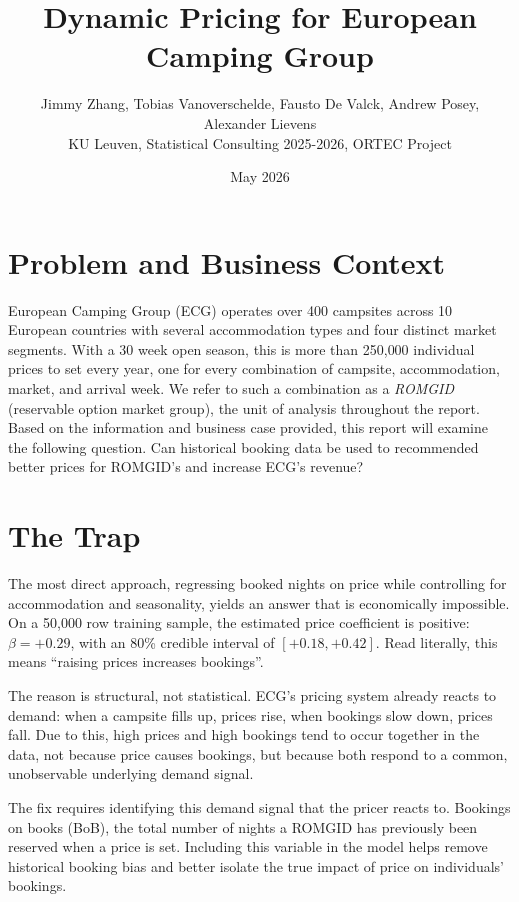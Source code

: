 \documentclass[11pt,a4paper]{article}
\title{Dynamic Pricing for European Camping Group}
\author{Jimmy Zhang, Tobias Vanoverschelde, Fausto De Valck, Andrew Posey,
Alexander Lievens \\ KU Leuven, Statistical Consulting 2025-2026, ORTEC Project}
\date{May 2026}
\begin{document}
\maketitle

\section{Problem and Business Context}

European Camping Group (ECG) operates over 400 campsites across 10 European countries with several accommodation types and four distinct market segments. With a 30 week open season, this is more than 250{,}000 individual prices to set every year, one for every combination of campsite, accommodation, market, and arrival week. We refer to such a combination as a \emph{ROMGID} (reservable option market group), the unit of analysis throughout the report. Based on the information and business case provided, this report will examine the following question. Can historical booking data be used to recommended better prices for ROMGID’s and increase ECG’s revenue?

\section{The Trap}

The most direct approach, regressing booked nights on price while controlling for accommodation and seasonality, yields an answer that is economically impossible. On a 50{,}000 row training sample, the estimated price coefficient is positive: $\beta = +0.29$, with an 80\% credible interval of $[+0.18, +0.42]$. Read literally, this means ``raising prices increases bookings''.

The reason is structural, not statistical. ECG's pricing system already reacts to demand: when a campsite fills up, prices rise, when bookings slow down, prices fall. Due to this, high prices and high bookings tend to occur together in the data, not because price causes bookings, but because both respond to a common, unobservable underlying demand signal.

The fix requires identifying this demand signal that the pricer reacts to. Bookings on books (BoB), the total number of nights a ROMGID has previously been reserved when a price is set. Including this variable in the model helps remove historical booking bias and better isolate the true impact of price on individuals’ bookings.
\end{document}
